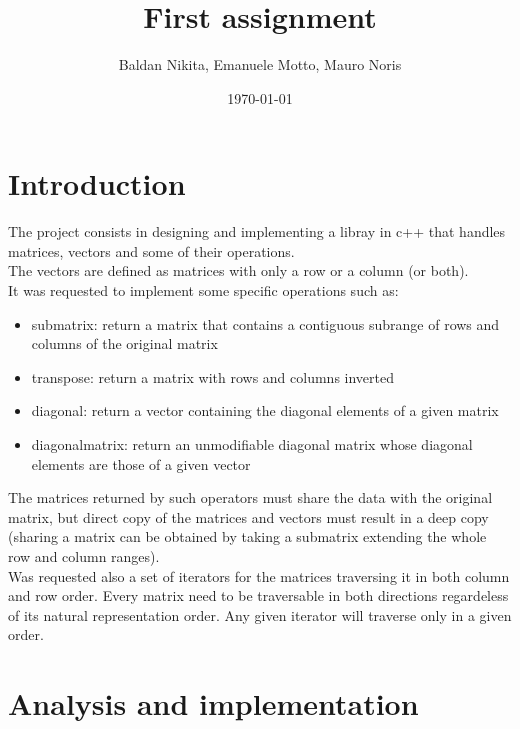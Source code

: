 \documentclass[12pt]{article}%
\begin{document}
\title{First assignment}
\author{Baldan Nikita, Emanuele Motto, Mauro Noris}
\date{\today}
\maketitle

\newpage

\tableofcontents %
\newpage

\section{Introduction}

The project consists in designing and implementing a libray in c++ that handles matrices, vectors and
some of their operations.\\

The vectors are defined as matrices with only a row or a column (or both).\\
It was requested to implement some specific operations such as:
\begin{itemize}
    \item submatrix: return a matrix that contains a contiguous subrange of rows and columns of the original matrix
    \item transpose: return a matrix with rows and columns inverted
    \item diagonal: return a vector containing the diagonal elements of a given matrix
    \item diagonalmatrix: return an unmodifiable diagonal matrix whose diagonal elements are those of a given vector
\end{itemize}





The matrices returned by such operators must share the data with the original matrix, but direct copy of the matrices and vectors must result in a deep copy (sharing a matrix can be obtained by taking a submatrix extending the whole row and column ranges).\\

Was requested also a set of iterators for the matrices traversing it in both column and row order.
Every matrix need to be traversable in both directions regardeless of its natural representation order.
Any given iterator will traverse only in a given order.\\
 

\section{Analysis and implementation}
\end{document}

